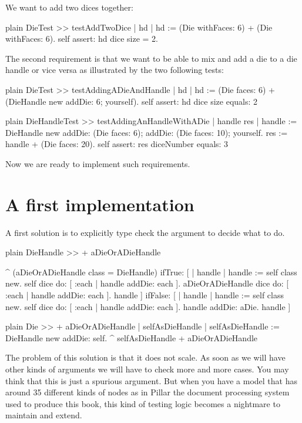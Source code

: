 \documentclass[10pt,twoside,english]{_support/latex/sbabook/sbabook}
\begin{document}
We want to add two dices together:

\begin{displaycode}{plain}
DieTest >> testAddTwoDice
	| hd |
	hd := (Die withFaces: 6) + (Die withFaces: 6).
	self assert: hd dice size = 2.
\end{displaycode}

The second requirement is that we want to be able to mix and add a die to a die handle or vice versa as illustrated by the two following tests: 

\begin{displaycode}{plain}
DieTest >> testAddingADieAndHandle
	| hd |
	hd := (Die faces: 6)
		+
		(DieHandle new
			addDie: 6;
			yourself).
	self assert: hd dice size equals: 2
\end{displaycode}

\begin{displaycode}{plain}
DieHandleTest >> testAddingAnHandleWithADie
	| handle res |
	handle := DieHandle new
		addDie: (Die faces: 6);
		addDie: (Die faces: 10);
		yourself.
	res := handle + (Die faces: 20).
	self assert: res diceNumber equals: 3
\end{displaycode}

Now we are ready to implement such requirements. 
\section{A first implementation}
A first solution is to explicitly type check the argument to decide what to do. 

\begin{displaycode}{plain}
DieHandle >> + aDieOrADieHandle

	^ (aDieOrADieHandle class = DieHandle) 
		ifTrue: [ | handle |
					handle := self class new.
					self dice do: [ :each | handle addDie: each ].
					aDieOrADieHandle dice do: [ :each | handle addDie: each ].
					handle ]
		ifFalse: [ | handle |
					handle := self class new.
					self dice do: [ :each | handle addDie: each ].
					handle addDie: aDie.
					handle  ]
\end{displaycode}

\begin{displaycode}{plain}
Die >> + aDieOrADieHandle
	| selfAsDieHandle |
	selfAsDieHandle := DieHandle new addDie: self.
	^ selfAsDieHandle + aDieOrADieHandle
\end{displaycode}

The problem of this solution is that it does not scale. As soon as we will have other kinds of arguments we will have to check more and more cases. You may think that this is just a spurious argument. But when you have a model that has around 35 different kinds of nodes as in Pillar the document processing system used to produce this book, this kind of testing logic becomes a nightmare to maintain and extend.
\end{document}
